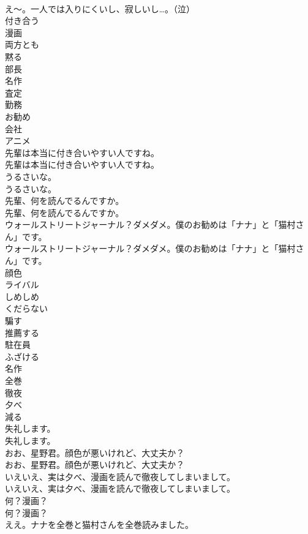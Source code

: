 \documentclass[8pt]{extreport}
\begin{document}
\begin{CJK}{UTF8}{min}
\\	え～。一人では入りにくいし、寂しいし…。（泣） 
\\	付き合う
\\	漫画
\\	両方とも
\\	黙る
\\	部長
\\	名作
\\	査定
\\	勤務
\\	お勧め
\\	会社
\\	アニメ
\\	先輩は本当に付き合いやすい人ですね。	
\\	先輩は本当に付き合いやすい人ですね。 
\\	うるさいな。	
\\	うるさいな。 
\\	先輩、何を読んでるんですか。	
\\	先輩、何を読んでるんですか。 
\\	ウォールストリートジャーナル？ダメダメ。僕のお勧めは「ナナ」と「猫村さん」です。	
\\	ウォールストリートジャーナル？ダメダメ。僕のお勧めは「ナナ」と「猫村さん」です。 
\\	顔色
\\	ライバル
\\	しめしめ
\\	くだらない
\\	騙す
\\	推薦する
\\	駐在員
\\	ふざける
\\	名作
\\	全巻
\\	徹夜
\\	夕べ
\\	減る
\\	失礼します。	
\\	失礼します。 
\\	おお、星野君。顔色が悪いけれど、大丈夫か？	
\\	おお、星野君。顔色が悪いけれど、大丈夫か？ 
\\	いえいえ、実は夕べ、漫画を読んで徹夜してしまいまして。	
\\	いえいえ、実は夕べ、漫画を読んで徹夜してしまいまして。 
\\	何？漫画？	
\\	何？漫画？ 
\\	ええ。ナナを全巻と猫村さんを全巻読みました。	

\end{CJK}
\end{document}

